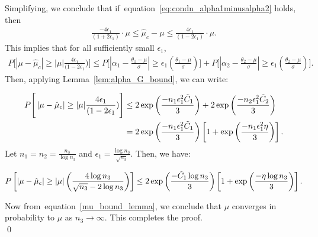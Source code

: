 \documentclass[10pt]{article} %
\def\eqref#1{equation~\ref{#1}}
\theoremstyle{plain}
\theoremstyle{definition}
\theoremstyle{remark}
\begin{document}
Simplifying, we conclude that if~\eqref{eq:condn_alpha1minusalpha2} holds, then
\begin{align}
\frac{-4\epsilon_1}{(1 + 2 \epsilon_1)}  \cdot \mu  \leq \hat{\mu}_c - \mu  \leq   \frac{4 \epsilon_1}{(1 - 2 \epsilon_1)}  \cdot  \mu. 
\end{align}
This implies that for all sufficiently small $\epsilon_1$,
\begin{align*}
P \Bigg[ \left| \mu - \hat{\mu}_c \right| \geq |\mu| \frac{4 \epsilon_1}{(1 - 2 \epsilon_1} ) \Bigg] \leq  P \Bigg[ \left| \alpha_1 - \frac{\theta_1 - \mu}{\sigma} \right| \geq \epsilon_1 \left( \frac{\theta_1 - \mu }{\sigma} \right) \Bigg] +   P \Bigg[ \left| \alpha_2 - \frac{\theta_2 - \mu}{\sigma} \right| \geq \epsilon_1 \left( \frac{\theta_2 - \mu }{\sigma} \right) \Bigg]. \label{mu-muhat-exp}
\end{align*}
Then, applying Lemma~\ref{lem:alpha_G_bound}, we can write:


\begin{equation}
\begin{aligned}
 P \Bigg[ \left| \mu - \hat{\mu}_c \right| \geq |\mu| \frac{4 \epsilon_1}{(1 - 2 \epsilon_1} ) \Bigg] & \leq 2\exp \left( \frac{-n_1 \epsilon_{1}^{2} \Tilde{C}_1}{3}  \right) + 2\exp \left(  \frac{-n_2 \epsilon_{1}^{2} \Tilde{C}_2}{3}  \right) \\
  & =  2 \exp \left( \frac{-n_1 \epsilon_{1}^{2} \Tilde{C}_1}{3}  \right) \left[ 1+ \exp \left ( \frac{-n_1 \epsilon_{1}^{2}\eta } {3}\right)  \right ].
\end{aligned}
\end{equation}
Let \(n_1 = n_2 = \frac{n_3}{\log n_3}\) and \(\epsilon_1= \frac{\log n_3}{\sqrt{n_3}}\). Then, we have:

\begin{equation}
\begin{aligned}
P \left [  \vert    \mu - \hat{\mu}_c   \vert \geq |\mu| \left(  \frac{4 \log n_3}{ \sqrt{n_3} - 2 \log n_3} \right ) \right] \leq   2 \exp \left( \frac{ -\Tilde{C}_1 \log n_3}{3} \right) \left[ 1+ \exp \left(  \frac{ -\eta \log n_3 }{3}\right)  \right ].
\end{aligned}
\label{mu_bound_lemma}
\end{equation}

Now from~\eqref{mu_bound_lemma}, we conclude that \(\mu\) converges in probability to \(\mu\) as \(n_3 \to \infty\). This completes the proof. \\
\qed

\end{document}
